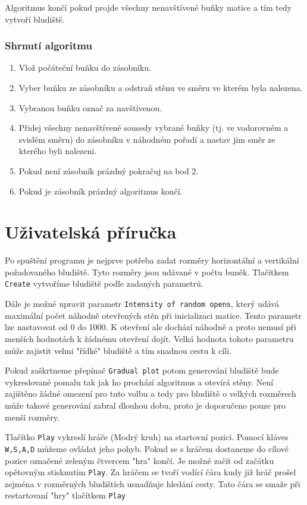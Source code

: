 \documentclass[12pt]{article}
\begin{document}
Algoritmus končí pokud projde všechny nenavštívené buňky matice a tím tedy vytvoří bludiště. 



\subsubsection{Shrnutí algoritmu}

\begin{enumerate}
\item Vlož počáteční buňku do zásobníku.
\item Vyber buňku ze zásobníku a odstraň stěnu ve směru ve kterém byla nalezena.
\item Vybranou buňku označ za navštívenou.
\item Přidej všechny nenavštívené sousedy vybrané buňky (tj. ve vodorovném a svislém směru) do zásobníku v náhodném pořadí a nastav jim směr ze kterého byli nalezeni.
\item Pokud není zásobník prázdný pokračuj na bod 2.
\item Pokud je zásobník prázdný algoritmus končí.
\end{enumerate}


\section{Uživatelská příručka}
Po spuštění programu je nejprve potřeba zadat rozměry horizontální a vertikální požadovaného bludiště. Tyto rozměry jsou udávané v počtu buněk. Tlačítkem \texttt{Create} vytvoříme bludiště podle zadaných parametrů. 

Dále je možné upravit parametr \texttt{Intensity of random opens}, který udává maximální počet náhodně otevřených stěn při inicializaci matice. Tento parametr lze nastavovat od 0 do 1000. K otevření ale dochází náhodně a proto nemusí při menších hodnotách k žádnému otevření dojít. Velká hodnota tohoto parametru může zajistit velmi "řídké" bludiště a tím snadnou cestu k cíli.

Pokud zaškrtneme přepínač \texttt{Gradual plot} potom generování bludiště bude vykreslované pomalu tak jak ho prochází algoritmus a otevírá stěny. Není zajištěno žádné omezení pro tuto volbu a tedy pro bludiště o velkých rozměrech může takové generování zabral dlouhou dobu, proto je doporučeno pouze pro menší rozměry.

Tlačítko \texttt{Play} vykreslí hráče (Modrý kruh) na startovní pozici. Pomocí kláves \texttt{W,S,A,D} můžeme ovládat jeho pohyb. Pokud se s hráčem dostaneme do cílové pozice označené zeleným čtvercem "hra" končí. Je možné začít od začátku opětovným stisknutím \texttt{Play}. Za hráčem se tvoří vodící čára kudy již hráč prošel zejména v rozměrných bludištích usnadňuje hledání cesty. Tato čára se smaže při restartovaní "hry" tlačítkem \texttt{Play}
\end{document}
